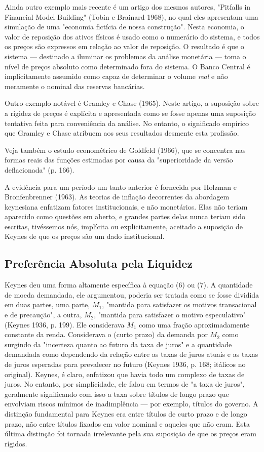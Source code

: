\documentclass[12pt]{article}
\begin{document}
Ainda outro exemplo mais recente é um artigo dos mesmos autores, "Pitfalls in Financial Model Building" (Tobin e Brainard 1968), no qual eles apresentam uma simulação de uma "economia fictícia de nossa construção". Nesta economia, o valor de reposição dos ativos físicos é usado como o numerário do sistema, e todos os preços são expressos em relação ao valor de reposição. O resultado é que o sistema — destinado a iluminar os problemas da análise monetária — toma o nível de preços absoluto como determinado fora do sistema. O Banco Central é implicitamente assumido como capaz de determinar o volume \textit{real} e não meramente o nominal das reservas bancárias.

Outro exemplo notável é Gramley e Chase (1965). Neste artigo, a suposição sobre a rigidez de preços é explícita e apresentada como se fosse apenas uma suposição tentativa feita para conveniência da análise. No entanto, o significado empírico que Gramley e Chase atribuem aos seus resultados desmente esta profissão.

Veja também o estudo econométrico de Goldfeld (1966), que se concentra nas formas reais das funções estimadas por causa da "superioridade da versão deflacionada" (p. 166).

A evidência para um período um tanto anterior é fornecida por Holzman e Bronfenbrenner (1963). As teorias de inflação decorrentes da abordagem keynesiana enfatizam fatores institucionais, e não monetários. Elas não teriam aparecido como questões em aberto, e grandes partes delas nunca teriam sido escritas, tivéssemos nós, implícita ou explicitamente, aceitado a suposição de Keynes de que os preços são um dado institucional.

\subsection{Preferência Absoluta pela Liquidez}

Keynes deu uma forma altamente específica à equação (6) ou (7). A quantidade de moeda demandada, ele argumentou, poderia ser tratada como se fosse dividida em duas partes, uma parte, $M_1$, "mantida para satisfazer os motivos transacional e de precaução", a outra, $M_2$, "mantida para satisfazer o motivo especulativo" (Keynes 1936, p. 199). Ele considerava $M_1$ como uma fração aproximadamente constante da renda. Considerava o (curto prazo) da demanda por $M_2$ como surgindo da "incerteza quanto ao futuro da taxa de juros" e a quantidade demandada como dependendo da relação entre as taxas de juros atuais e as taxas de juros esperadas para prevalecer no futuro (Keynes 1936, p. 168; itálicos no original). Keynes, é claro, enfatizou que havia todo um complexo de taxas de juros. No entanto, por simplicidade, ele falou em termos de "a taxa de juros", geralmente significando com isso a taxa sobre títulos de longo prazo que envolviam riscos mínimos de inadimplência — por exemplo, títulos do governo. A distinção fundamental para Keynes era entre títulos de curto prazo e de longo prazo, não entre títulos fixados em valor nominal e aqueles que não eram. Esta última distinção foi tornada irrelevante pela sua suposição de que os preços eram rígidos.
\end{document}
